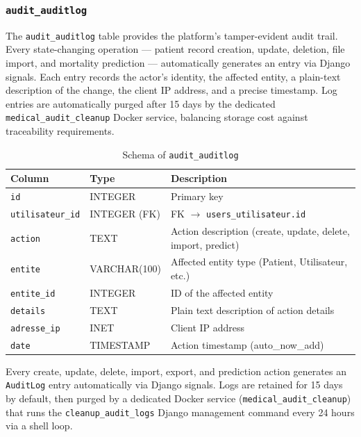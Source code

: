 \documentclass[12pt,a4paper,twoside]{report}
\begin{document}
\subsubsection{\texttt{audit\_auditlog}}

The \texttt{audit\_auditlog} table provides the platform's tamper-evident audit trail. Every state-changing operation — patient record creation, update, deletion, file import, and mortality prediction — automatically generates an entry via Django signals. Each entry records the actor's identity, the affected entity, a plain-text description of the change, the client IP address, and a precise timestamp. Log entries are automatically purged after 15 days by the dedicated \texttt{medical\_audit\_cleanup} Docker service, balancing storage cost against traceability requirements.

\begin{table}[htbp]
\centering
\caption{Schema of \texttt{audit\_auditlog}}
\label{tab:schema_audit}
\small\begin{tabularx}{\textwidth}{p{3.2cm}p{3cm}X}
\toprule
\textbf{Column} & \textbf{Type} & \textbf{Description} \\
\midrule
\texttt{id} & INTEGER & Primary key \\
\texttt{utilisateur\_id} & INTEGER (FK) & FK $\to$ \texttt{users\_utilisateur.id} \\
\texttt{action} & TEXT & Action description (create, update, delete, import, predict) \\
\texttt{entite} & VARCHAR(100) & Affected entity type (Patient, Utilisateur, etc.) \\
\texttt{entite\_id} & INTEGER & ID of the affected entity \\
\texttt{details} & TEXT & Plain text description of action details \\
\texttt{adresse\_ip} & INET & Client IP address \\
\texttt{date} & TIMESTAMP & Action timestamp (auto\_now\_add) \\
\bottomrule
\end{tabularx}
\end{table}

Every create, update, delete, import, export, and prediction action generates an \texttt{AuditLog} entry automatically via Django signals. Logs are retained for 15 days by default, then purged by a dedicated Docker service (\texttt{medical\_audit\_cleanup}) that runs the \texttt{cleanup\_audit\_logs} Django management command every 24 hours via a shell loop.
\end{document}
